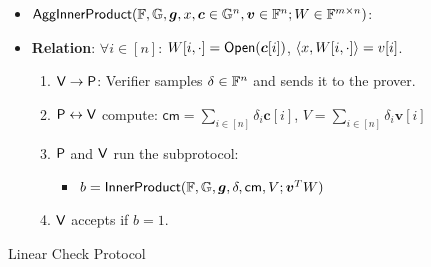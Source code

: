 \begin{figure}[h!]
\begin{framed}
\begin{itemize}
\item $\mathsf{AggInnerProduct}(\mathbb{F},\mathbb{G},\bm{g},x,\bm{c}\in \mathbb{G}^n,\bm{v}\in \mathbb{F}^n;W\in
\mathbb{F}^{m\times n})$:
\item {\bf Relation}: $\forall i\in [n]$: $W[i,\cdot]=\mathsf{Open}(\bm{c}[i])$,
$\langle x,W[i,\cdot]\rangle=v[i]$. 
\begin{enumerate}
\item $\mathsf{V}\rightarrow\mathsf{P}$: Verifier samples $\delta\in \mathbb{F}^n$ and
sends it to the prover.
\item $\mathsf{P}\leftrightarrow\mathsf{V}$ compute: $\mathsf{cm}=\sum_{i\in
[n]}\delta_i\bm{c}[i]$, $V=\sum_{i\in [n]}\delta_i\bm{v}[i]$
\item $\mathsf{P}$ and $\mathsf{V}$ run the subprotocol:
	\begin{itemize}
	\item $b=\mathsf{InnerProduct}(\mathbb{F},\mathbb{G},\bm{g},\delta,\mathsf{cm},V;\bm{v}^TW)$
	\end{itemize}
\item $\mathsf{V}$ accepts if $b=1$.
\end{enumerate}
\end{itemize}
\end{framed}
\caption{Linear Check Protocol}
\label{fig:linearcheck}
\end{figure}

